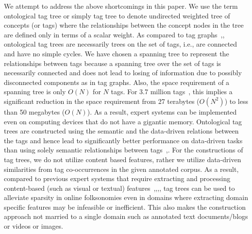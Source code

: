 We attempt to address the above shortcomings in this paper. We use the term ontological tag tree or simply tag tree to denote undirected weighted tree of concepts (or tags) where the relationships between the concept nodes in the tree are defined only in terms of a scalar weight. 
As compared to tag graphs~\cite{sigurbjornsson2008flickr},\cite{liu2009tag}, ontological tag trees are necessarily trees on the set of tags, i.e., are connected and have no simple cycles. We have chosen a spanning tree to represent the relationships between tags because a spanning tree over the set of tags is necessarily connected and does not lead to losing of information due to possibly disconnected components as in tag graphs. Also, the space requirement of a spanning tree is only $O(N)$ for $N$ tags. For 3.7 million tags~\cite{sigurbjornsson2008flickr}, this implies a significant reduction in the space requirement from 27 terabytes ($O(N^2)$) to less than 50 megabytes ($O(N)$). As a result, expert systems can be implemented even on computing devices that do not have a gigantic memory. Ontological tag trees are constructed using the semantic and the data-driven relations between the tags and hence lead to significantly better performance on data-driven tasks than using solely semantic relationships between tags~\cite{MohdSemantic13},\cite{wordnet}. 
For the constructions of tag trees, we do not utilize content based features, rather we utilize data-driven similarities from tag co-occurrences in the given annotated corpus. As a result, compared to previous expert systems that require extracting and processing content-based (such as visual or textual) features~\cite{HsiehCollab09},\cite{ChenEstim15},\cite{SunLang11},\cite{ZhaoqiangRegulariz15}, tag trees can be used to alleviate sparsity in online folksonomies even in domains where extracting domain specific features may be infeasible or inefficient. This also makes the construction approach not married to a single domain such as annotated text documents/blogs or videos or images.



